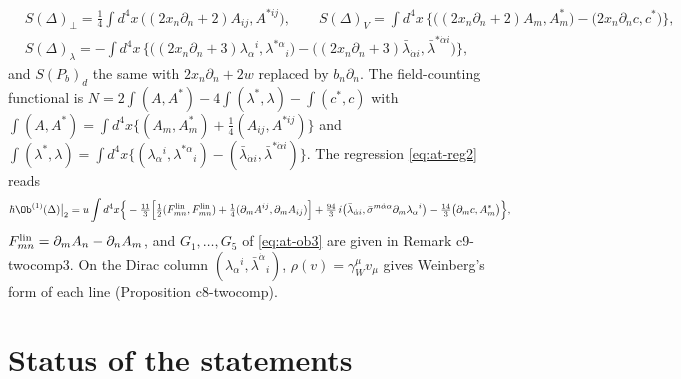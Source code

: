 \begin{remark}
\[
\begin{aligned}
&S(\Delta)_\perp=\tfrac14\int d^4x\,\big((2x_n\partial_n+2)A_{ij},A^{*ij}\big),\qquad S(\Delta)_V=\int d^4x\,\Big\{\big((2x_n\partial_n+2)A_m,A^*_m\big)-\big(2x_n\partial_nc,c^*\big)\Big\},\\
&S(\Delta)_\lambda=-\int d^4x\,\Big\{\big((2x_n\partial_n+3)\lambda_\alpha{}^i,\lambda^{*\alpha}{}_i\big)-\big((2x_n\partial_n+3)\bar\lambda_{\dot\alpha i},\bar\lambda^{*\dot\alpha i}\big)\Big\},
\end{aligned}
\]
and $S(P_b)_d$ the same with $2x_n\partial_n+2w$ replaced by $b_n\partial_n$. The field-counting functional is $N=2\int(A,A^*)-4\int(\lambda^*,\lambda)-\int(c^*,c)$ with $\int(A,A^*)=\int d^4x\{(A_m,A^*_m)+\tfrac14(A_{ij},A^{*ij})\}$ and $\int(\lambda^*,\lambda)=\int d^4x\{(\lambda_\alpha{}^i,\lambda^{*\alpha}{}_i)-(\bar\lambda_{\dot\alpha i},\bar\lambda^{*\dot\alpha i})\}$. The regression \eqref{eq:at-reg2} reads
\[
\hbar\Ob^{(1)}(\Delta)\big|_2=u\int d^4x\Big\{-\tfrac{11}3\Big[\tfrac12(F^{\rm lin}_{mn},F^{\rm lin}_{mn})+\tfrac14(\partial_mA^{ij},\partial_mA_{ij})\Big]+\tfrac{94}3\,i\big(\bar\lambda_{\dot\alpha i},\bar\sigma^{m\dot\alpha\alpha}\partial_m\lambda_\alpha{}^i\big)-\tfrac{14}3\big(\partial_mc,A^*_m\big)\Big\},
\]
$F^{\rm lin}_{mn}=\partial_mA_n-\partial_nA_m$, and $G_1,\dots,G_5$ of \eqref{eq:at-ob3} are given in Remark c9-twocomp3. On the Dirac column $(\lambda_\alpha{}^i,\bar\lambda^{\dot\alpha}{}_i)$, $\rho(v)=\gamma_W^\mu v_\mu$ gives Weinberg's form of each line (Proposition c8-twocomp).
\end{remark}

\section{Status of the statements}
\label{sec:at-status}

